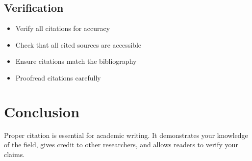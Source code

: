 \documentclass{article}
\begin{document}
\subsection{Verification}
\begin{itemize}
    \item Verify all citations for accuracy
    \item Check that all cited sources are accessible
    \item Ensure citations match the bibliography
    \item Proofread citations carefully
\end{itemize}

\section{Conclusion}
Proper citation is essential for academic writing. It demonstrates your knowledge of the field, gives credit to other researchers, and allows readers to verify your claims.

\printbibliography
\end{document}
